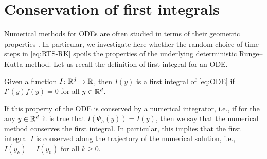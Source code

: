 \documentclass[10pt]{article}
\begin{document}

\section{Conservation of first integrals}\label{sec:GeomProperties}
Numerical methods for ODEs are often studied in terms of their geometric properties \cite{HLW06}. In particular, we investigate here whether the random choice of time steps in \eqref{eq:RTS-RK} spoils the properties of the underlying deterministic Runge--Kutta method. Let us recall the definition of first integral for an ODE.
\begin{definition} Given a function $I\colon\mathbb{R}^d\to\mathbb{R}$, then $I(y)$ is a first integral of \eqref{eq:ODE} if $I'(y)f(y) = 0$ for all $y \in \mathbb{R}^d$. 
\end{definition}	
If this property of the ODE is conserved by a numerical integrator, i.e., if for the any $y\in\mathbb{R}^d$ it is true that $I(\Psi_h(y)) = I(y)$, then we say that the numerical method conserves the first integral. In particular, this implies that the first integral $I$ is conserved along the trajectory of the numerical solution, i.e., $I(y_k) = I(y_0)$ for all $k\geq 0$.
	
\end{document}
